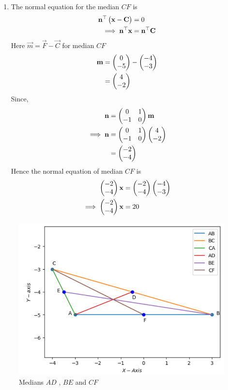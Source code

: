 \documentclass[11pt]{book}
\begin{document}
\begin{enumerate}[label=\thesection.\arabic*.,ref=\thesection.\theenumi]
\begin{enumerate}
\item The normal equation for the median $CF$ is
\begin{align}
\mathbf{n}^{\top}\begin{pmatrix}\mathbf{x}-\mathbf{C}\end{pmatrix}&=0\\
\implies
\mathbf{n}^{\top}\mathbf{x}&=\mathbf{n}^{\top}\mathbf{C}
\end{align}
Here $\vec{m} = \vec{F}- \vec{C}$ for median $CF$
\begin{align}
\mathbf{m}&=\begin{pmatrix}0\\-5\end{pmatrix} - \begin{pmatrix}-4\\-3\end{pmatrix}\\
       &=\begin{pmatrix}4\\-2\end{pmatrix}
\end{align}
Since,
\begin{align}
  \mathbf{n} &= \begin{pmatrix}0 & 1\\
  -1 & 0\end{pmatrix}\mathbf{m}\\
\implies
\mathbf{n} &= \begin{pmatrix}0 & 1\\
  -1 & 0\end{pmatrix}\begin{pmatrix}4 \\ -2 \end{pmatrix}\\
        &= \begin{pmatrix}-2 \\ -4\end{pmatrix}
\end{align}
Hence the normal equation of median $CF$ is 
\begin{align}
    \begin{pmatrix}-2 \\ -4 \end{pmatrix}\mathbf{x}&=\begin{pmatrix}-2 \\ -4\end{pmatrix}\begin{pmatrix}-4\\-3\end{pmatrix}\\
\implies
    \begin{pmatrix}-2 \\ -4\end{pmatrix}\mathbf{x}&=20
\end{align}
\end{enumerate}
\begin{figure}
\includegraphics[width=\columnwidth]{figs/midpt_lines.png}
\caption{ Medians $AD$ , $BE$ and $CF$}
\label{fig: medians}
\end{figure}



\end{enumerate}
\end{document}
